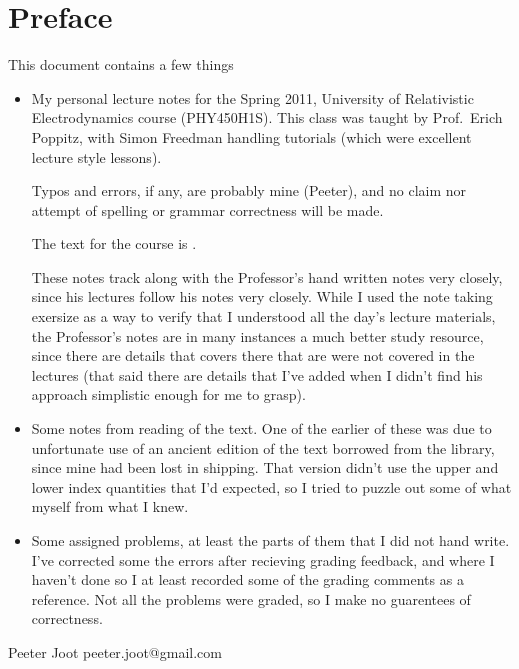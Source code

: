 \chapter*{Preface}\normalsize

This document contains a few things

\begin{itemize}
\item My personal lecture notes for the Spring 2011, University of Relativistic Electrodynamics course (PHY450H1S).  This class was taught by Prof.\ Erich Poppitz, with Simon Freedman handling tutorials (which were excellent lecture style lessons).

Typos and errors, if any, are probably mine (Peeter), and no claim nor attempt of spelling or grammar correctness will be made.  

The text for the course is \cite{landau1980classical}.

These notes track along with the Professor's hand written notes very closely, since his lectures follow his notes very closely.  While I used the note taking exersize as a way to verify that I understood all the day's lecture materials, the Professor's notes are in many instances a much better study resource, since there are details that covers there that are were not covered in the lectures (that said there are details that I've added when I didn't find his approach simplistic enough for me to grasp).

\item Some notes from reading of the text.  One of the earlier of these was due to unfortunate use of an ancient edition of the text borrowed from the library, since mine had been lost in shipping.  That version didn't use the upper and lower index quantities that I'd expected, so I tried to puzzle out some of what myself from what I knew.

\item Some assigned problems, at least the parts of them that I did not hand write.  I've corrected some the errors after recieving grading feedback, and where I haven't done so I at least recorded some of the grading comments as a reference.  Not all the problems were graded, so I make no guarentees of correctness.

%
\end{itemize}

Peeter Joot  \quad peeter.joot@gmail.com 

